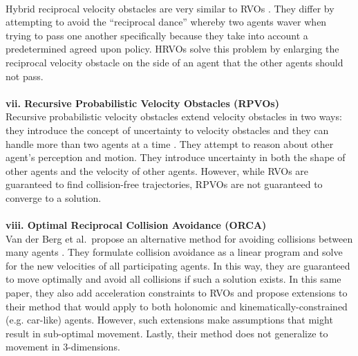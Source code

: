 \documentclass[tog]{acmsiggraph}
\begin{document}
\\
Hybrid reciprocal velocity obstacles are very similar to RVOs \cite{snape2011hybrid}. They differ by attempting to avoid the ``reciprocal dance'' whereby two agents waver when trying to pass one another specifically because they take into account a predetermined agreed upon policy. HRVOs solve this problem by enlarging the reciprocal velocity obstacle on the side of an agent that the other agents should not pass.
\\ \\
\textbf{vii. Recursive Probabilistic Velocity Obstacles (RPVOs)}
\\
Recursive probabilistic velocity obstacles extend velocity obstacles in two ways: they introduce the concept of uncertainty to velocity obstacles and they can handle more than two agents at a time \cite{kluge2006recursive}. They attempt to reason about other agent's perception and motion. They introduce uncertainty in both the shape of other agents and the velocity of other agents. However, while RVOs are guaranteed to find collision-free trajectories, RPVOs are not guaranteed to converge to a solution.
\\ \\
\textbf{viii. Optimal Reciprocal Collision Avoidance (ORCA)}
\\
Van der Berg et al.\ propose an alternative method for avoiding collisions between many agents \cite{van2011reciprocal2}. They formulate collision avoidance as a linear program and solve for the new velocities of all participating agents. In this way, they are guaranteed to move optimally and avoid all collisions if such a solution exists.  In this same paper, they also add acceleration constraints to RVOs and propose extensions to their method that would apply to both holonomic and kinematically-constrained (e.g. car-like) agents. However, such extensions make assumptions that might result in sub-optimal movement. Lastly, their method does not generalize to movement in 3-dimensions.
\end{document}
